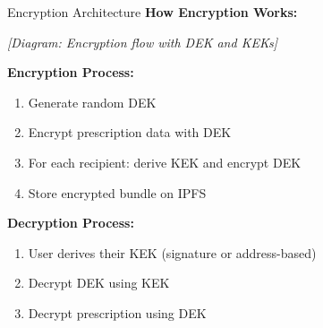 \documentclass[10pt]{beamer}
\begin{document}
\begin{frame}{Encryption Architecture}
\textbf{How Encryption Works:}

\vspace{0.2cm}
\begin{center}
\textit{[Diagram: Encryption flow with DEK and KEKs]}
\end{center}

\vspace{0.2cm}
\textbf{Encryption Process:}
\begin{enumerate}
\item Generate random DEK
\item Encrypt prescription data with DEK
\item For each recipient: derive KEK and encrypt DEK
\item Store encrypted bundle on IPFS
\end{enumerate}

\vspace{0.2cm}
\textbf{Decryption Process:}
\begin{enumerate}
\item User derives their KEK (signature or address-based)
\item Decrypt DEK using KEK
\item Decrypt prescription using DEK
\end{enumerate}
\end{frame}
\end{document}

